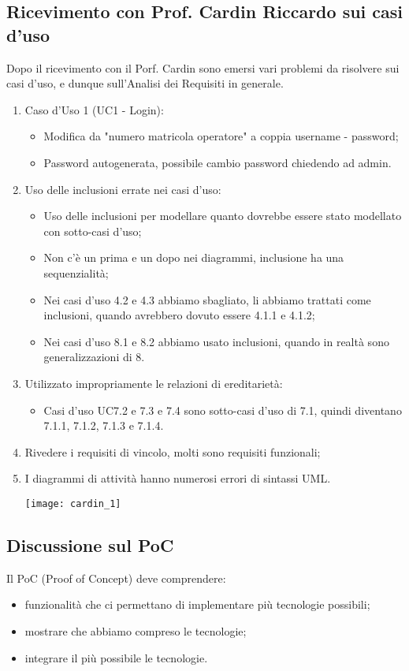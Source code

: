	\subsection{Ricevimento con Prof. Cardin Riccardo sui casi d'uso}
	Dopo il ricevimento con il Porf. Cardin sono emersi vari problemi da risolvere sui casi d'uso, e dunque sull'Analisi dei Requisiti in generale.
	\begin{enumerate}
		\item Caso d'Uso 1 (UC1 - Login):
			\begin{itemize}
				\item Modifica da "numero matricola operatore" a coppia username - password;
				\item Password autogenerata, possibile cambio password chiedendo ad admin.
			\end{itemize}
		\item Uso delle inclusioni errate nei casi d'uso:
			\begin{itemize}
				\item Uso delle inclusioni per modellare quanto dovrebbe essere stato modellato con sotto-casi d'uso;
				\item Non c'è un prima e un dopo nei diagrammi, inclusione ha una sequenzialità;
				\item Nei casi d'uso 4.2 e 4.3 abbiamo sbagliato, li abbiamo trattati come inclusioni, quando avrebbero dovuto essere 4.1.1 e 4.1.2;
				\item Nei casi d'uso 8.1 e 8.2 abbiamo usato inclusioni, quando in realtà sono generalizzazioni di 8.
			\end{itemize}
		\item Utilizzato impropriamente le relazioni di ereditarietà:
			\begin{itemize}
				\item Casi d'uso UC7.2 e 7.3 e 7.4 sono sotto-casi d'uso di 7.1, quindi diventano 7.1.1, 7.1.2, 7.1.3 e 7.1.4.
			\end{itemize}
		\item Rivedere i requisiti di vincolo, molti sono requisiti funzionali;
		\pagebreak
		\item I diagrammi di attività hanno numerosi errori di sintassi UML.
		\begin{center}
			\texttt{[image: cardin\_1]}\\
		\end{center}
	\end{enumerate}
	\pagebreak
	\subsection{Discussione sul PoC}
	Il PoC (Proof of Concept) deve comprendere:
	\begin{itemize}
		\item funzionalità che ci permettano di implementare più tecnologie possibili;
		\item mostrare che abbiamo compreso le tecnologie;
		\item integrare il più possibile le tecnologie.
	\end{itemize}

